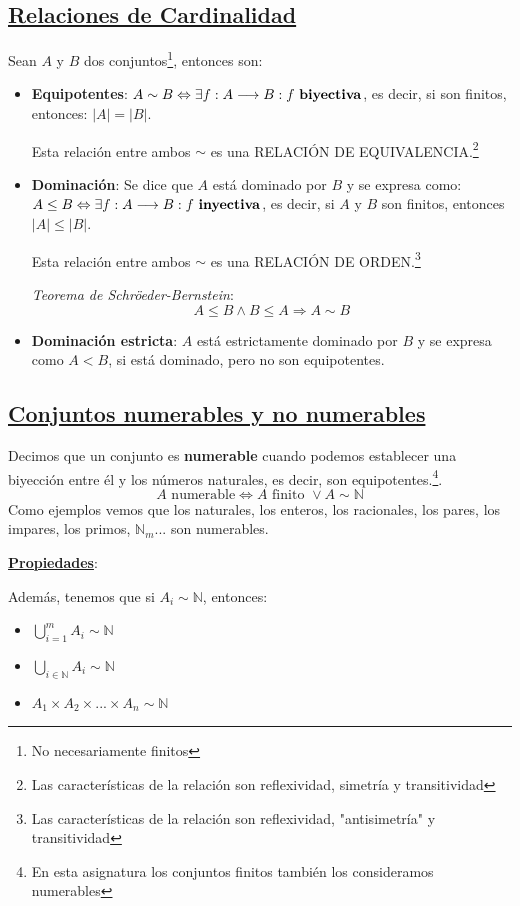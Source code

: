 \documentclass[10pt,a4paper,openright]{book}
\begin{document}
\subsection*{\underline{Relaciones de Cardinalidad}}
Sean $A$ y $B$ dos conjuntos\footnote{No necesariamente finitos}, entonces son:
\begin{itemize}
\item \textbf{Equipotentes}: $A\sim B \Leftrightarrow \exists f: A\longrightarrow B: f \mbox{ \textbf{biyectiva}}$, es decir, si son finitos, entonces: $|A|=|B|$.\par
Esta relación entre ambos $\sim$ es una RELACIÓN DE EQUIVALENCIA.\footnote{Las características de la relación son reflexividad, simetría y transitividad}

\item \textbf{Dominación}: Se dice que $A$ está dominado por $B$ y se expresa como: $A\leq B\Leftrightarrow \exists f: A\longrightarrow B: f\mbox{ \textbf{inyectiva}}$, es decir, si $A$ y $B$ son finitos, entonces $|A|\leq |B|$.\par
Esta relación entre ambos $\sim$ es una RELACIÓN DE ORDEN.\footnote{Las características de la relación son reflexividad, "antisimetría" y transitividad}\par
\textit{Teorema de Schröeder-Bernstein}:
$$A\leq B \wedge B\leq A\Rightarrow A\sim B$$

\item \textbf{Dominación estricta}: $A$ está estrictamente dominado por $B$ y se expresa como $A<B$, si está dominado, pero no son equipotentes.
\end{itemize}

\subsection*{\underline{Conjuntos numerables y no numerables}}
Decimos que un conjunto es \textbf{numerable} cuando podemos establecer una biyección entre él y los números naturales, es decir, son equipotentes.\footnote{En esta asignatura los conjuntos finitos también los consideramos numerables}.
$$A\mbox{ numerable}\Leftrightarrow A\mbox{ finito }\vee A\sim \mathbb N$$
Como ejemplos vemos que los naturales, los enteros, los racionales, los pares, los impares, los primos, $\mathbb N_m$... son numerables.\par

\textbf{\underline{Propiedades}}:\par
Además, tenemos que si $A_i\sim \mathbb N$, entonces:
\begin{itemize}
\item $\bigcup_{i=1}^m A_i\sim \mathbb N$
\item $\bigcup_{i\in \mathbb N} A_i\sim \mathbb N$
\item $A_1\times A_2\times ...\times A_n\sim \mathbb N$
\end{itemize}
\end{document}
